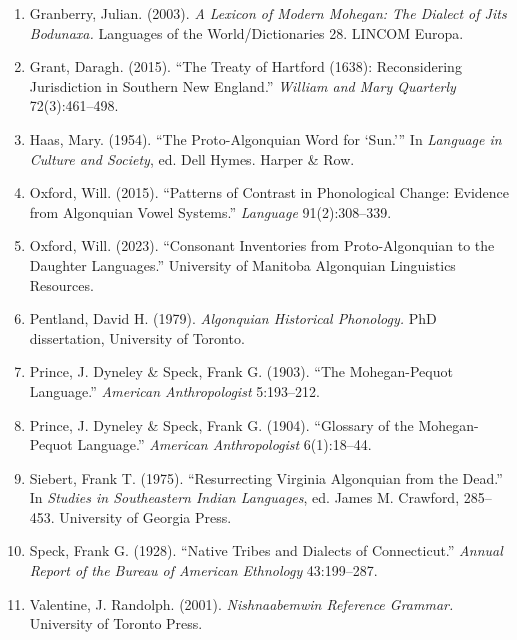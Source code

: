 \begin{enumerate}
\item Granberry, Julian. (2003). \emph{A Lexicon of Modern Mohegan: The
Dialect of Jits Bodunaxa.} Languages of the World/Dictionaries 28. LINCOM
Europa.

\item Grant, Daragh. (2015). ``The Treaty of Hartford (1638): Reconsidering
Jurisdiction in Southern New England.'' \emph{William and Mary Quarterly}
72(3):461--498.

\item Haas, Mary. (1954). ``The Proto-Algonquian Word for `Sun.''' In
\emph{Language in Culture and Society}, ed. Dell Hymes. Harper \& Row.

\item Oxford, Will. (2015). ``Patterns of Contrast in Phonological Change:
Evidence from Algonquian Vowel Systems.'' \emph{Language} 91(2):308--339.

\item Oxford, Will. (2023). ``Consonant Inventories from Proto-Algonquian to
the Daughter Languages.'' University of Manitoba Algonquian Linguistics
Resources.

\item Pentland, David H. (1979). \emph{Algonquian Historical Phonology.} PhD
dissertation, University of Toronto.

\item Prince, J. Dyneley \& Speck, Frank G. (1903). ``The Mohegan-Pequot
Language.'' \emph{American Anthropologist} 5:193--212.

\item Prince, J. Dyneley \& Speck, Frank G. (1904). ``Glossary of the
Mohegan-Pequot Language.'' \emph{American Anthropologist} 6(1):18--44.

\item Siebert, Frank T. (1975). ``Resurrecting Virginia Algonquian from the
Dead.'' In \emph{Studies in Southeastern Indian Languages}, ed. James M.
Crawford, 285--453. University of Georgia Press.

\item Speck, Frank G. (1928). ``Native Tribes and Dialects of Connecticut.''
\emph{Annual Report of the Bureau of American Ethnology} 43:199--287.

\item Valentine, J. Randolph. (2001). \emph{Nishnaabemwin Reference
Grammar.} University of Toronto Press.

\end{enumerate}
